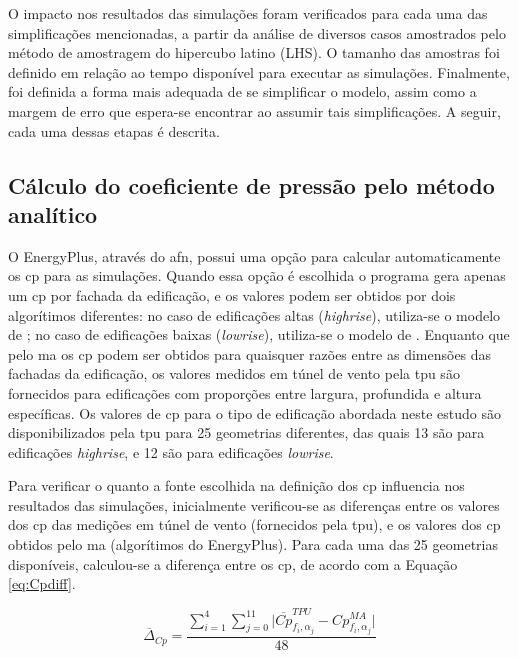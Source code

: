 \documentclass[brazil,hardcopy,openany]{ufscthesis} %
\begin{document}
O impacto nos resultados das simulações foram verificados para cada uma das simplificações mencionadas, a partir da análise de diversos casos amostrados pelo método de amostragem do hipercubo latino (LHS). O tamanho das amostras foi definido em relação ao tempo disponível para executar as simulações.
Finalmente, foi definida a forma mais adequada de se simplificar o modelo, assim como a margem de erro que espera-se encontrar ao assumir tais simplificações.
A seguir, cada uma dessas etapas é descrita.

\subsection*{Cálculo do coeficiente de pressão pelo método analítico}

O EnergyPlus, através do \acrshort{afn}, possui uma opção para calcular automaticamente os \acrshort{cp} para as simulações.
Quando essa opção é escolhida o programa gera apenas um \acrshort{cp} por fachada da edificação, e os valores podem ser obtidos por dois algorítimos diferentes: no caso de edificações altas (\textit{highrise}), utiliza-se o modelo de ; no caso de edificações baixas (\textit{lowrise}), utiliza-se o modelo de .
Enquanto que pelo \acrlong{ma} os \acrshort{cp} podem ser obtidos para quaisquer razões entre as dimensões das fachadas da edificação, os valores medidos em túnel de vento pela \acrshort{tpu} são fornecidos para edificações com proporções entre largura, profundida e altura específicas.
Os valores de \acrshort{cp} para o tipo de edificação abordada neste estudo são disponibilizados pela \acrshort{tpu} para 25 geometrias diferentes, das quais 13 são para edificações \textit{highrise}, e 12 são para edificações \textit{lowrise}.

Para verificar o quanto a fonte escolhida na definição dos \acrshort{cp} influencia nos resultados das simulações, inicialmente verificou-se as diferenças entre os valores dos \acrshort{cp} das medições em túnel de vento (fornecidos pela \acrshort{tpu}), e os valores dos \acrshort{cp} obtidos pelo \acrlong{ma} (algorítimos do EnergyPlus). Para cada uma das 25 geometrias disponíveis, calculou-se a diferença entre os \acrshort{cp}, de acordo com a Equação \ref{eq:Cpdiff}.

\begin{equation}
\label{eq:Cpdiff}
\overline{\Delta}_{Cp} = \frac{\sum_{i=1}^{4}{\sum_{j=0}^{11}{|\overline{Cp}^{TPU}_{f_i,\alpha_j} - Cp^{MA}_{f_i,\alpha_j}}|}}{48}
\end{equation}
\end{document}
